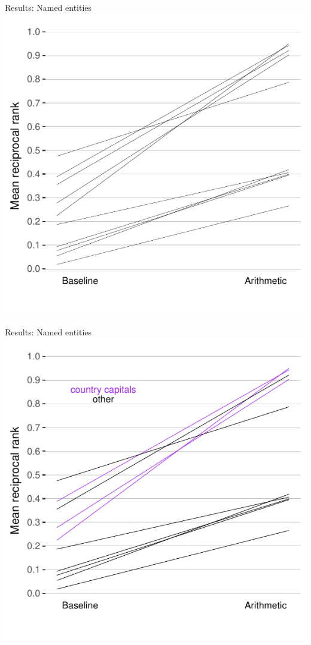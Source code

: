 \documentclass{beamer}
\begin{document}
\begin{frame}{Results: Named entities}
\centering
\includegraphics[scale=.8]{named.pdf}
\end{frame}
\begin{frame}{Results: Named entities}
\centering
\includegraphics[scale=.8]{named2.pdf}
\end{frame}
\end{document}
